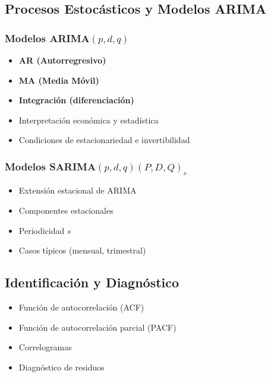 \documentclass[12pt, a4paper]{article}
\begin{document}
\subsection{Procesos Estocásticos y Modelos ARIMA}

\subsubsection{Modelos ARIMA$(p,d,q)$}

\begin{itemize}
  \item \textbf{AR (Autorregresivo)}
  \item \textbf{MA (Media Móvil)}
  \item \textbf{Integración (diferenciación)}
  \item Interpretación económica y estadística
  \item Condiciones de estacionariedad e invertibilidad
\end{itemize}

\subsubsection{Modelos SARIMA$(p,d,q)(P,D,Q)_s$}

\begin{itemize}
  \item Extensión estacional de ARIMA
  \item Componentes estacionales
  \item Periodicidad $s$
  \item Casos típicos (mensual, trimestral)
\end{itemize}

\subsection{Identificación y Diagnóstico}

\begin{itemize}
  \item Función de autocorrelación (ACF)
  \item Función de autocorrelación parcial (PACF)
  \item Correlogramas
  \item Diagnóstico de residuos
\end{itemize}
\end{document}
